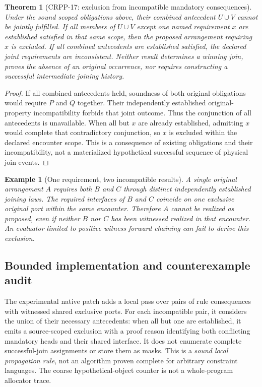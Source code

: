 \documentclass[11pt]{article}
\newtheorem{theorem}[definition]{Theorem}
\newtheorem{example}[definition]{Example}
\begin{document}
\begin{theorem}[CRPP-17: exclusion from incompatible mandatory consequences]
Under the sound scoped obligations above, their combined
antecedent $U\cup V$ cannot be jointly fulfilled.
If all members of $U\cup V$ except one named requirement
$x$ are established satisfied in that same scope,
then the proposed arrangement requiring $x$ is excluded.
If all combined antecedents are established satisfied,
the declared joint requirements are inconsistent.
Neither result determines a winning join, proves the
absence of an original occurrence, nor requires
constructing a successful intermediate joining history.
\end{theorem}
\begin{proof}
If all combined antecedents held, soundness of both
original obligations would require $P$ and $Q$ together.
Their independently established original-property
incompatibility forbids that joint outcome. Thus
the conjunction of all antecedents is unavailable.
When all but $x$ are already established, admitting
$x$ would complete that contradictory conjunction,
so $x$ is excluded within the declared encounter scope.
This is a consequence of existing obligations and
their incompatibility, not a materialized hypothetical
successful sequence of physical join events.
\end{proof}

\begin{example}[One requirement, two incompatible results]
A single original arrangement $A$ requires both $B$ and $C$
through distinct independently established joining laws.
The required interfaces of $B$ and $C$ coincide on one
exclusive original port within the same encounter.
Therefore $A$ cannot be realized as proposed, even if
neither $B$ nor $C$ has been witnessed realized in that
encounter. An evaluator limited to positive witness
forward chaining can fail to derive this exclusion.
\end{example}

\subsection{Bounded implementation and counterexample audit}
The experimental native patch adds a local pass over pairs
of rule consequences with witnessed shared exclusive
ports. For each incompatible pair, it considers the union
of their necessary antecedents: when all but one are
established, it emits a source-scoped exclusion with a
proof reason identifying both conflicting mandatory heads
and their shared interface. It does not enumerate complete
successful-join assignments or store them as masks.
This is a \emph{sound local propagation rule}, not an
algorithm proven complete for arbitrary constraint
languages. The coarse hypothetical-object counter is
not a whole-program allocator trace.
\end{document}
